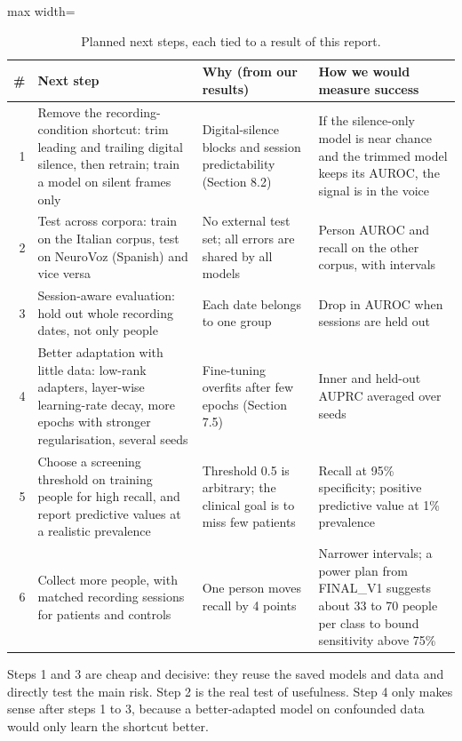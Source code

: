 \documentclass[11pt,a4paper]{article}
\begin{document}
\begin{table}[H]\centering\footnotesize\renewcommand{\arraystretch}{1.15}
\caption{Planned next steps, each tied to a result of this report.}
\begin{adjustbox}{max width=\linewidth}\begin{tabular}{rp{4.2cm}p{4.6cm}p{5.4cm}}
\toprule
\textbf{\#} & \textbf{Next step} & \textbf{Why (from our results)} & \textbf{How we would measure success}\\
\midrule
1 & Remove the recording-condition shortcut: trim leading and trailing digital silence, then retrain; train a model on silent frames only & Digital-silence blocks and session predictability (Section 8.2) & If the silence-only model is near chance and the trimmed model keeps its AUROC, the signal is in the voice\\
2 & Test across corpora: train on the Italian corpus, test on NeuroVoz (Spanish) and vice versa & No external test set; all errors are shared by all models & Person AUROC and recall on the other corpus, with intervals\\
3 & Session-aware evaluation: hold out whole recording dates, not only people & Each date belongs to one group & Drop in AUROC when sessions are held out\\
4 & Better adaptation with little data: low-rank adapters, layer-wise learning-rate decay, more epochs with stronger regularisation, several seeds & Fine-tuning overfits after few epochs (Section 7.5) & Inner and held-out AUPRC averaged over seeds\\
5 & Choose a screening threshold on training people for high recall, and report predictive values at a realistic prevalence & Threshold 0.5 is arbitrary; the clinical goal is to miss few patients & Recall at 95\% specificity; positive predictive value at 1\% prevalence\\
6 & Collect more people, with matched recording sessions for patients and controls & One person moves recall by 4 points & Narrower intervals; a power plan from FINAL\_V1 suggests about 33 to 70 people per class to bound sensitivity above 75\%\\
\bottomrule
\end{tabular}\end{adjustbox}\end{table}
Steps 1 and 3 are cheap and decisive: they reuse the saved models and data and directly test the main risk. Step 2 is the real test of usefulness. Step 4 only makes sense after steps 1 to 3, because a better-adapted model on confounded data would only learn the shortcut better.
\end{document}

